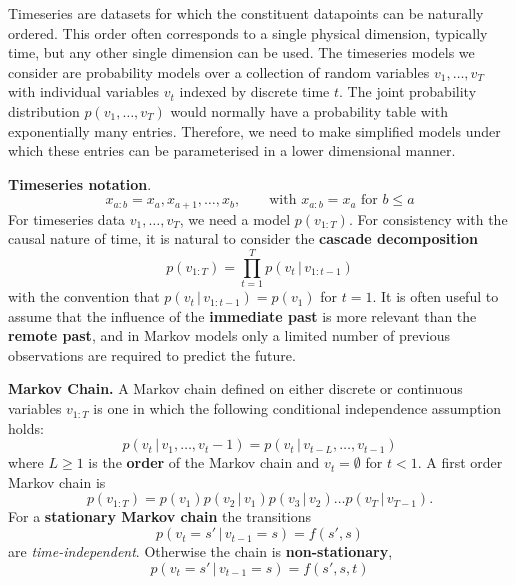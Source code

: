 \documentclass{article}
\newcommand{\giv}{\,|\,}
\begin{document}
Timeseries are datasets for which the constituent datapoints can be naturally ordered. This order often corresponds to a single physical dimension, typically time, but any other single dimension can be used. The timeseries models we consider are probability models over a collection of random variables $v_1, \dots, v_T$ with individual variables $v_t$ indexed by discrete time $t$. The joint probability distribution $p(v_1, \dots, v_T)$ would normally have a probability table with exponentially many entries. Therefore, we need to make simplified models under which these entries can be parameterised in a lower dimensional manner.
\\
\begin{theorem}
    \textbf{Timeseries notation}. 
    $$
        x_{a:b} = x_a, x_{a+1}, \dots, x_{b}, \qquad \text{with } x_{a:b} = x_a \text{ for } b \leq a
    $$
    For timeseries data $v_1, \dots, v_T$, we need a model $p(v_{1:T})$. For consistency with the causal nature of time, it is natural to consider the \textbf{cascade decomposition}
    $$
        p(v_{1:T}) = \prod_{t=1}^T p(v_t \giv v_{1:t-1})
    $$
    with the convention that $p(v_t \giv v_{1:t-1}) = p(v_1)$ for $t=1$. It is often useful to assume that the influence of the \textbf{immediate past} is more relevant than the \textbf{remote past}, and in Markov models only a limited number of previous observations are required to predict the future. 
\end{theorem}

\begin{theorem}
    \textbf{Markov Chain.} A Markov chain defined on either discrete or continuous variables $v_{1:T}$ is one in which the following conditional independence assumption holds:
    $$
        p(v_t \giv v_1, \dots, v_t-1) = p(v_t \giv v_{t-L}, \dots, v_{t-1})
    $$
    where $L \geq 1$ is the \textbf{order} of the Markov chain and $v_t = \emptyset$ for $t < 1$. A first order Markov chain is
    $$
        p(v_{1:T}) = p(v_1)p(v_2 \giv v_1)p(v_3 \giv v_2) \dots p(v_T \giv v_{T-1}).
    $$
    For a \textbf{stationary Markov chain} the transitions 
    $$
        p(v_t = s' \giv v_{t-1} = s) = f(s', s)
    $$ 
    are \textit{time-independent}. Otherwise the chain is \textbf{non-stationary}, 
    $$
        p(v_t = s' \giv v_{t-1} = s) = f(s', s, t)
    $$
\end{theorem}
\end{document}
